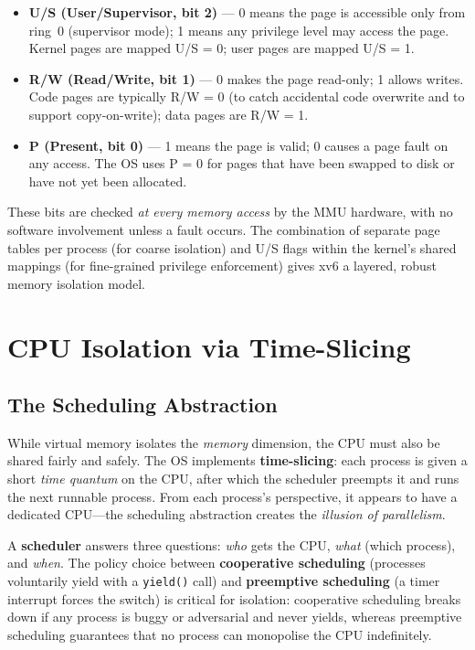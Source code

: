 \documentclass[11pt]{article}
\begin{document}
\begin{itemize}
    \item \textbf{U/S (User/Supervisor, bit 2)} --- 0 means the page is accessible only
          from ring~0 (supervisor mode); 1 means any privilege level may access the page.
          Kernel pages are mapped U/S = 0; user pages are mapped U/S = 1.
    \item \textbf{R/W (Read/Write, bit 1)} --- 0 makes the page read-only; 1 allows writes.
          Code pages are typically R/W = 0 (to catch accidental code overwrite and to
          support copy-on-write); data pages are R/W = 1.
    \item \textbf{P (Present, bit 0)} --- 1 means the page is valid; 0 causes a page fault
          on any access. The OS uses P = 0 for pages that have been swapped to disk or have
          not yet been allocated.
\end{itemize}

These bits are checked \emph{at every memory access} by the MMU hardware, with no software
involvement unless a fault occurs. The combination of separate page tables per process (for
coarse isolation) and U/S flags within the kernel's shared mappings (for fine-grained
privilege enforcement) gives xv6 a layered, robust memory isolation model.

\section{CPU Isolation via Time-Slicing}

\subsection{The Scheduling Abstraction}

While virtual memory isolates the \emph{memory} dimension, the CPU must also be shared
fairly and safely. The OS implements \textbf{time-slicing}: each process is given a short
\emph{time quantum} on the CPU, after which the scheduler preempts it and runs the next
runnable process. From each process's perspective, it appears to have a dedicated CPU---the
scheduling abstraction creates the \emph{illusion of parallelism}.

A \textbf{scheduler} answers three questions: \emph{who} gets the CPU, \emph{what}
(which process), and \emph{when}. The policy choice between \textbf{cooperative scheduling}
(processes voluntarily yield with a \texttt{yield()} call) and \textbf{preemptive
scheduling} (a timer interrupt forces the switch) is critical for isolation: cooperative
scheduling breaks down if any process is buggy or adversarial and never yields, whereas
preemptive scheduling guarantees that no process can monopolise the CPU indefinitely.
\end{document}
